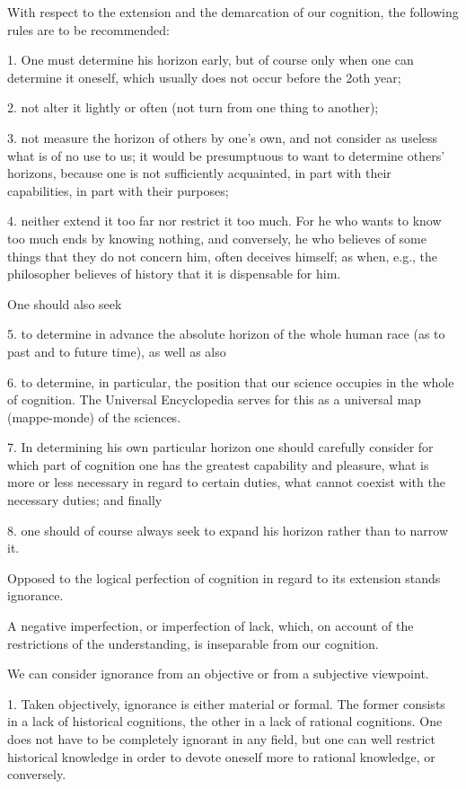     With respect to the extension and the demarcation of our cognition,
    the following rules are to be recommended:

    1. One must determine his horizon early,
    but of course only when one can determine it oneself,
    which usually does not occur before the 2oth year;

    2. not alter it lightly or often
    (not turn from one thing to another);

    3. not measure the horizon of others by one's own,
    and not consider as useless what is of no use to us;
    it would be presumptuous to want to determine others' horizons,
    because one is not sufficiently acquainted,
    in part with their capabilities,
    in part with their purposes;

    4. neither extend it too far nor restrict it too much.
    For he who wants to know too much ends by knowing nothing,
    and conversely, he who believes of some things
    that they do not concern him, often deceives himself;
    as when, e.g., the philosopher believes of history
    that it is dispensable for him.

    One should also seek

    5. to determine in advance the absolute horizon of
    the whole human race (as to past and to future time),
    as well as also

    6. to determine, in particular, the position that
    our science occupies in the whole of cognition.
    The Universal Encyclopedia serves for this as
    a universal map (mappe-monde) of the sciences.

    7. In determining his own particular horizon one should carefully consider for
    which part of cognition one has the greatest capability and pleasure, what is
    more or less necessary in regard to certain duties, what cannot coexist with
    the necessary duties; and finally

    8. one should of course always seek
    to expand his horizon rather than to narrow it.

    Opposed to the logical perfection of cognition
    in regard to its extension stands ignorance.

    A negative imperfection, or imperfection of lack, which,
    on account of the restrictions of the understanding,
    is inseparable from our cognition.

    We can consider ignorance from an objective or from a subjective viewpoint.

    1. Taken objectively, ignorance is either material or formal.
    The former consists in a lack of historical cognitions,
    the other in a lack of rational cognitions.
    One does not have to be completely ignorant in any field,
    but one can well restrict historical knowledge in order to
    devote oneself more to rational knowledge, or conversely.

